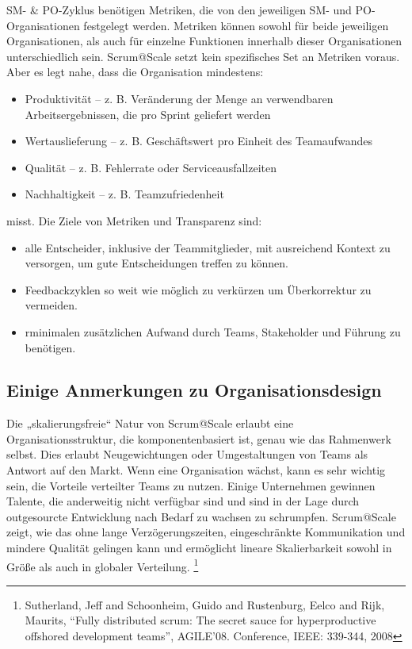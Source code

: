 \documentclass[12pt,a4paper,parskip=full]{scrartcl}
\begin{document}
SM- \& PO-Zyklus benötigen Metriken, die von den jeweiligen SM- und
PO-Organisationen festgelegt werden. Metriken können sowohl für beide jeweiligen
Organisationen, als auch für einzelne Funktionen innerhalb dieser Organisationen
unterschiedlich sein. Scrum@Scale setzt kein spezifisches Set an Metriken voraus.
Aber es legt nahe, dass die Organisation mindestens:
\begin{itemize}
\item Produktivität – z. B. Veränderung der Menge an verwendbaren Arbeitsergebnissen,
die pro Sprint geliefert werden
\item Wertauslieferung – z. B. Geschäftswert pro Einheit des Teamaufwandes
\item Qualität – z. B. Fehlerrate oder Serviceausfallzeiten
\item Nachhaltigkeit – z. B. Teamzufriedenheit
\end{itemize}
misst.
Die Ziele von Metriken und Transparenz sind:
\begin{itemize}
\item alle Entscheider, inklusive der Teammitglieder, mit ausreichend Kontext zu
versorgen, um gute Entscheidungen treffen zu können.
\item Feedbackzyklen so weit wie möglich zu verkürzen um Überkorrektur zu vermeiden.
\item rminimalen zusätzlichen Aufwand durch Teams, Stakeholder und Führung zu
benötigen.
\end{itemize}

\subsection{Einige Anmerkungen zu Organisationsdesign}
Die „skalierungsfreie“ Natur von Scrum@Scale erlaubt eine Organisationsstruktur,
die komponentenbasiert ist, genau wie das Rahmenwerk selbst. Dies erlaubt
Neugewichtungen oder Umgestaltungen von Teams als Antwort auf den Markt.
Wenn eine Organisation wächst, kann es sehr wichtig sein, die Vorteile verteilter
Teams zu nutzen. Einige Unternehmen gewinnen Talente, die anderweitig nicht
verfügbar sind und sind in der Lage durch outgesourcte Entwicklung nach Bedarf
zu wachsen zu schrumpfen. Scrum@Scale zeigt, wie das ohne lange
Verzögerungszeiten, eingeschränkte Kommunikation und mindere Qualität gelingen
kann und ermöglicht lineare Skalierbarkeit sowohl in Größe als auch in globaler
Verteilung. \footnote{Sutherland, Jeff and Schoonheim,
Guido and Rustenburg, Eelco and Rijk, Maurits, ``Fully distributed scrum:
The secret sauce for hyperproductive offshored development teams'',
AGILE'08. Conference, IEEE: 339-344, 2008}
\end{document}
